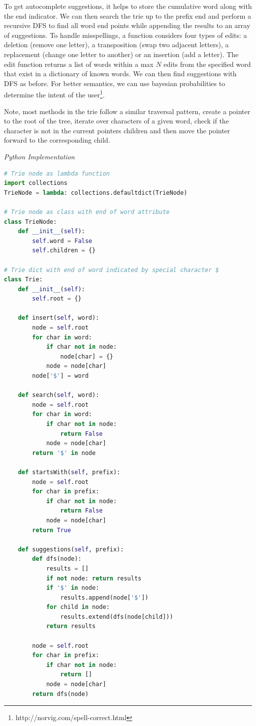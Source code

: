 \documentclass{article}
\begin{document}
    To get autocomplete suggestions, it helps to store the cumulative word along with the end indicator. We can then search the trie up to the prefix end and perform a recursive DFS to find all word end points while appending the results to an array of suggestions. To handle misspellings, a function considers four types of edits: a deletion (remove one letter), a transposition (swap two adjacent letters), a replacement (change one letter to another) or an insertion (add a letter). The edit function returns a list of words within a max $N$ edits from the specified word that exist in a dictionary of known words. We can then find suggestions with DFS as before. For better semantics, we can use bayesian probabilities to determine the intent of the user\footnote{http://norvig.com/spell-correct.html}. 
    
    
    Note, most methods in the trie follow a similar traversal pattern, create a pointer to the root of the tree, iterate over characters of a given word, check if the character is not in the current pointers children and then move the pointer forward to the corresponding child.
    
\vspace{8pt} \emph{Python Implementation}
\begin{lstlisting}[language=Python]
# Trie node as lambda function
import collections
TrieNode = lambda: collections.defaultdict(TrieNode)

# Trie node as class with end of word attribute
class TrieNode:
    def __init__(self):
        self.word = False
        self.children = {}
        
# Trie dict with end of word indicated by special character $
class Trie:
    def __init__(self):
        self.root = {}

    def insert(self, word):
        node = self.root
        for char in word:
            if char not in node:
                node[char] = {}
            node = node[char]
        node['$'] = word

    def search(self, word):
        node = self.root
        for char in word:
            if char not in node:
                return False
            node = node[char]
        return '$' in node

    def startsWith(self, prefix):
        node = self.root
        for char in prefix:
            if char not in node:
                return False
            node = node[char]
        return True
        
    def suggestions(self, prefix):
        def dfs(node):
            results = []
            if not node: return results
            if '$' in node:
                results.append(node['$'])
            for child in node:
                results.extend(dfs(node[child]))
            return results
    
        node = self.root
        for char in prefix:
            if char not in node:
                return []
            node = node[char]
        return dfs(node)
\end{lstlisting}
\end{document}
